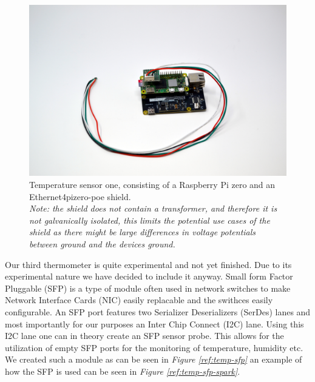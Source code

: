 \documentclass[12pt]{article}
\begin{document}
\begin{figure}
  \centering
  \includegraphics[width=\textwidth]{temp-sensor-one.JPG}
  \caption{Temperature sensor one, consisting of a Raspberry Pi zero and an Ethernet4pizero-poe shield. \\ 
  \textit{Note: the shield does not contain a transformer, and therefore it is 
  not galvanically isolated, this limits the potential use cases of the shield as there might be 
  large differences in voltage potentials between ground and the devices ground.}}
  \label{ref:temp-one}
\end{figure}

Our third thermometer is quite experimental and not yet finished.
Due to its experimental nature we have decided to include it anyway. 
Small form Factor Pluggable (SFP) is a type of module often used in network switches to 
make Network Interface Cards (NIC) easily replacable and the swithces easily configurable. 
An SFP port features two Serializer Deserializers (SerDes) lanes and most importantly for our purposes 
an Inter Chip Connect (I2C) lane. Using this I2C lane one can in theory create an SFP sensor probe. 
This allows for the utilization of empty SFP ports for the monitoring of temperature, humidity etc. 
We created such a module as can be seen in \textit{Figure \ref{ref:temp-sfp}} an example of how the SFP is used 
can be seen in \textit{Figure \ref{ref:temp-sfp-spark}}.
\end{document}
